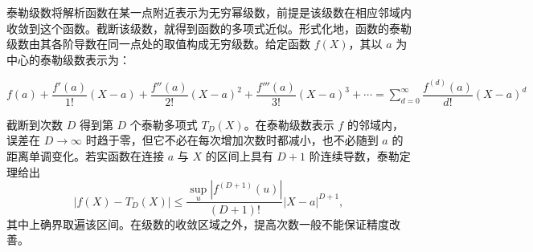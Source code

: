 泰勒级数将解析函数在某一点附近表示为无穷幂级数，前提是该级数在相应邻域内收敛到这个函数。截断该级数，就得到函数的多项式近似。形式化地，函数的泰勒级数由其各阶导数在同一点处的取值构成无穷级数。给定函数 $f(X)$，其以 $a$ 为中心的泰勒级数表示为：

$
f(a) + \dfrac{f'(a)}{1!}(X - a) + \dfrac{f''(a)}{2!}(X - a)^2 + \dfrac{f'''(a)}{3!}(X - a)^3 + \cdots = \sum\limits_{d=0}^{\infty}\dfrac{f^{(d)}(a)}{d!}(X - a)^d
$

截断到次数 $D$ 得到第 $D$ 个泰勒多项式 $T_D(X)$。在泰勒级数表示 $f$ 的邻域内，误差在 $D\to\infty$ 时趋于零，但它不必在每次增加次数时都减小，也不必随到 $a$ 的距离单调变化。若实函数在连接 $a$ 与 $X$ 的区间上具有 $D+1$ 阶连续导数，泰勒定理给出
\[
|f(X)-T_D(X)|\le\frac{\sup_{u}|f^{(D+1)}(u)|}{(D+1)!}|X-a|^{D+1},
\]
其中上确界取遍该区间。在级数的收敛区域之外，提高次数一般不能保证精度改善。